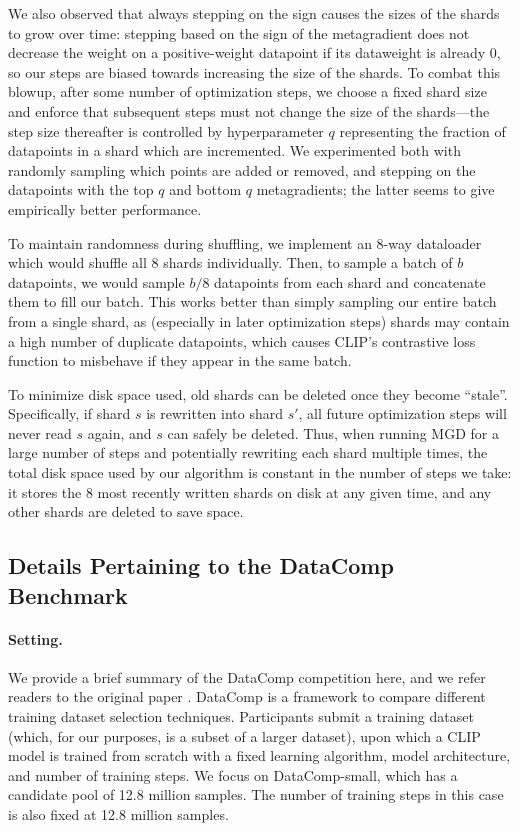 We also observed that always stepping on the sign causes the sizes of the
shards to grow over time: stepping based on the sign of the metagradient does
not decrease the weight on a positive-weight datapoint if its dataweight  is
already 0, so our steps are biased towards increasing the size of the shards. 
To combat this blowup, after some number of optimization steps, we choose a
fixed shard size and enforce that subsequent steps must not change the size of
the shards---the step size thereafter is controlled by hyperparameter $q$
representing the fraction of datapoints in a shard which are incremented.  We
experimented both with randomly sampling which points are added or removed, and
stepping on the datapoints with the top $q$ and bottom $q$ metagradients; the 
latter seems to give empirically better performance.

To maintain randomness during shuffling, we implement an 8-way dataloader which
would shuffle all 8 shards individually.  Then, to sample a batch of $b$
datapoints, we would sample $b / 8$ datapoints from each shard and concatenate
them to fill our batch.  This works better than simply sampling our entire
batch from a single shard, as (especially in later optimization steps) shards
may contain a high number of duplicate datapoints, which causes CLIP's
contrastive loss function to misbehave if they appear in the same batch.

To minimize disk space used, old shards can be deleted once they become
``stale''.  Specifically, if shard $s$ is rewritten into shard $s'$, all future
optimization steps will never read $s$ again, and $s$ can safely be
deleted.  Thus, when running MGD for a large number of steps and potentially
rewriting each shard multiple times, the total disk space used by our algorithm
is constant in the number of steps we take: it stores the 8 most recently written 
shards on disk at any given time, and any other shards are deleted to save space.

\subsection{Details Pertaining to the DataComp Benchmark}

\paragraph{Setting.}
We provide a brief summary of the DataComp competition here, and we refer
readers to the original paper \cite{gadre2024datacomp}.  DataComp is a
framework to compare different training dataset selection techniques. 
Participants submit a training dataset (which, for our purposes, is a subset of
a larger dataset), upon which a CLIP model is trained from scratch with a fixed
learning algorithm, model architecture, and number of training steps.  We focus
on DataComp-small, which has a candidate pool of 12.8 million samples.  The
number of training steps in this case is also fixed at 12.8 million samples. 

